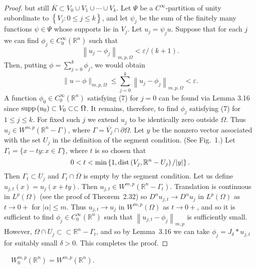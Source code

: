 \begin{proof}
  but still $\overline{K} \subset V_0 \cup V_1 \cup \cdots \cup V_k$.
  Let $\Psi$ be a $C^{\infty}$-partition of unity subordinate to $\left\{V_j: 0 \leq j \leq k\right\}$, and let $\psi_j$ be the sum of the finitely many functions $\psi \in \Psi$ whose supports lie in $V_j$. Let $u_j=\psi_j u$. Suppose that for each $j$ we can find $\phi_j \in C_0^{\infty}\left(\mathbb{R}^n\right)$ such that
  \begin{equation}\label{eq:3.7}
    \left\|u_j-\phi_j\right\|_{m, p, \Omega}<\varepsilon /(k+1) .
  \end{equation}
  Then, putting $\phi=\sum_{j=0}^k \phi_j$, we would obtain
  \[
  \|u-\phi\|_{m, p, \Omega} \leq \sum_{j=0}^k\left\|u_j-\phi_j\right\|_{m, p, \Omega}<\varepsilon .
  \]
  A function $\phi_0 \in C_0^{\infty}\left(\mathbb{R}^n\right)$ satisfying (7) for $j=0$ can be 
  found via Lemma 3.16 since $\operatorname{supp}\left(u_0\right) \subset V_0 \subset\subset \Omega$.
  It remains, therefore, to find $\phi_j$ satisfying (7) for $1 \leq j \leq k$.
  For fixed such $j$ we extend $u_j$ to be identically zero outside $\Omega$.
  Thus $u_j \in W^{m,p}\left(\mathbb{R}^n-\Gamma\right)$,
  where $\Gamma=\overline{V_j} \cap\partial\Omega$.
  Let $y$ be the nonzero vector associated with the set $U_j$ in the definition of the segment 
  condition. (See Fig.~1.) Let $\Gamma_t=\{x-t y: x \in \Gamma\}$, where $t$ is so chosen that
  \[
  0<t<\min \left\{1, \operatorname{dist}\left(V_j, \mathbb{R}^n-U_j\right) /|y|\right\}.
  \]
  Then $\Gamma_t \subset U_j$ and $\Gamma_t \cap \overline{\Omega}$ is empty by the segment condition. 
  Let us define $u_{j, t}(x)=u_j(x+t y)$.
  Then $u_{j, t} \in W^{m,p}\left(\mathbb{R}^n-\Gamma_t\right)$.
  Translation is continuous in $L^p(\Omega)$ (see the proof of Theorem~2.32)
  so $D^\alpha u_{j, t} \rightarrow D^\alpha u_j$ in $L^p(\Omega)$
  as $t \rightarrow 0+$ for $|\alpha| \leq m$.
  Thus $u_{j, t} \rightarrow u_j$ in $W^{m,p}(\Omega)$ as $t \rightarrow 0+$,
  and so it is sufficient to find $\phi_j \in C_0^{\infty}\left(\mathbb{R}^n\right)$
  such that $\left\|u_{j, t}-\phi_j\right\|_{m,p}$ is sufficiently small.
  However, $\Omega \cap U_j \subset\subset \mathbb{R}^n-\Gamma_t$,
  and so by Lemma~3.16 we can take $\phi_j=J_\delta * u_{j, t}$ for suitably small $\delta>0$. 
  This completes the proof.
\end{proof}


\begin{corollary}
  $\quad W_0^{m, p}\left(\mathbb{R}^n\right)=W^{m,p}\left(\mathbb{R}^n\right)$.
\end{corollary}


